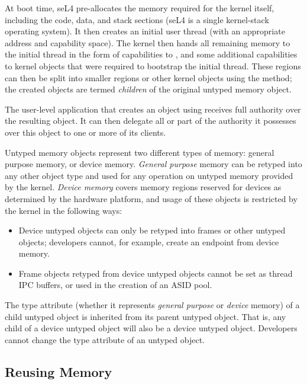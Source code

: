 At boot time, seL4 pre-allocates the memory required for the kernel
itself, including the code, data, and stack sections (seL4 is a single
kernel-stack operating system). It then creates an initial user
thread (with an appropriate address and capability space).
The kernel then hands all remaining memory to
the initial thread in the form of capabilities to , and
some additional capabilities to kernel objects that were required to
bootstrap the initial thread.  These  regions can then be split into
smaller regions or other kernel objects using the
 method; the created objects are termed \emph{children} of
the original untyped memory object.

The user-level application that creates an object using 
receives full authority over the resulting object. It can then delegate
all or part of the authority it possesses over this object to one or
more of its clients.

Untyped memory objects represent two different types of memory:
general purpose memory, or device memory.
\emph{General purpose} memory can be retyped into any other object
type and used for any operation on untyped memory provided by the kernel.
\emph{Device memory} covers memory regions reserved for devices
as determined by the hardware platform, and usage of these objects
is restricted by the kernel in the following ways:

\begin{itemize}
\item Device untyped objects can only be retyped into frames or other
untyped objects; developers cannot, for example, create an endpoint from device memory.
\item Frame objects retyped from device untyped objects cannot be set as thread IPC buffers, or used
in the creation of an ASID pool.
\end{itemize}

The type attribute (whether it represents \emph{general purpose} or
\emph{device} memory) of a child untyped object is inherited from its
parent untyped object. That is, any child of a device untyped object will
also be a device untyped object. Developers cannot change the type attribute of an untyped object.

\subsection{Reusing Memory}
\label{s:memRevoke}

